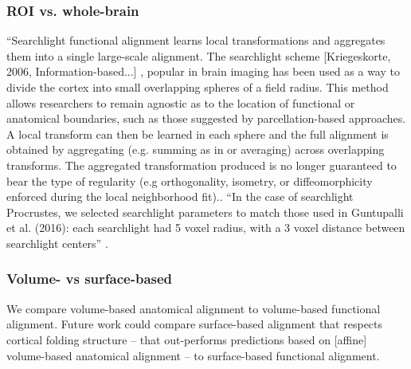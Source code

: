 \subsubsection{ROI vs. whole-brain}


``Searchlight functional alignment \citep{zhang2016searchlight,
guntupalli2016model} learns local transformations and aggregates them into a
single large-scale alignment.
%
The searchlight scheme [Kriegeskorte, 2006, Information-based...] , popular in
brain imaging \citep{guntupalli2018computational, guntupalli2016model} has been
used as a way to divide the cortex into small overlapping spheres of a field
radius.
%
This method allows researchers to remain agnostic as to the location of
functional or anatomical boundaries, such as those suggested by
parcellation-based approaches.
%
A local transform can then be learned in each sphere and the full alignment is
obtained by aggregating (e.g. summing as in \citep{guntupalli2016model} or
averaging) across overlapping transforms.
%
The aggregated transformation produced is no longer guaranteed to bear the type
of regularity (e.g orthogonality, isometry, or diffeomorphicity enforced during
the local neighborhood fit)..
%
``In the case of searchlight Procrustes, we selected searchlight parameters to
match those used in Guntupalli et al. (2016):
%
each searchlight had 5 voxel radius, with a 3 voxel distance between searchlight
centers'' \citep{bazeille2021empirical}.


\subsubsection{Volume- vs surface-based}



We compare volume-based anatomical alignment to volume-based functional
alignment.
%
Future work could compare surface-based alignment that respects cortical folding
structure -- that out-performs predictions based on [affine] volume-based
anatomical alignment \citep{weiner2018defining} -- to surface-based functional
alignment.


